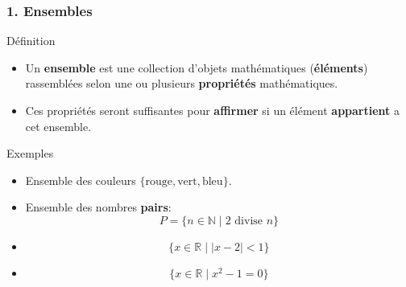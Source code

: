 \documentclass{beamer}
\begin{document}
\begin{frame}[<+->]
  \frametitle{1. Ensembles}
  \begin{block}{Définition}
    \scriptsize

    \begin{itemize}
      \item Un \textbf{\alert{ensemble}} est une collection d'objets mathématiques (\textbf{éléments})
    rassemblées selon une ou plusieurs \textbf{propriétés}
    mathématiques.\\[4pt]

  \item Ces propriétés seront suffisantes pour \textbf{affirmer}  si un élément
    \textbf{appartient} a cet ensemble.
\end{itemize}
  \end{block}
\begin{block}{Exemples}
  \begin{itemize}
    \scriptsize
    \item Ensemble des couleurs $\{\text{rouge}, \text{vert}, \text{bleu}\}$.
    \item Ensemble des nombres \textbf{pairs}:
      \begin{equation*}
        P = \{ n \in \mathbb{N}\;|\; 2 \text{ divise } n\}
      \end{equation*}
    \item 
      \begin{equation*}
        \{x\in\mathbb{R}\;|\; \vert x - 2 \vert < 1\}
      \end{equation*}
    \item 
      \begin{equation*}
        \{x\in\mathbb{R}\;|\; x^2 - 1 = 0\} 
      \end{equation*}
  \end{itemize}
\end{block}
\end{frame}
\end{document}
